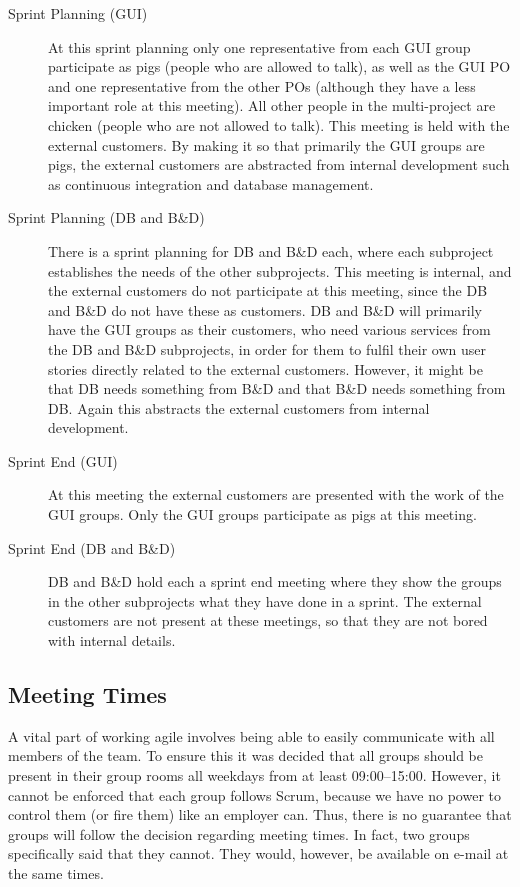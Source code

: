 \begin{description}
  \item[Sprint Planning (GUI)] At this sprint planning only one representative from each GUI group participate as pigs (people who are allowed to talk), as well as the GUI PO and one representative from the other POs (although they have a less important role at this meeting). All other people in the multi-project are chicken (people who are not allowed to talk). This meeting is held with the external customers. By making it so that primarily the GUI groups are pigs, the external customers are abstracted from internal development such as continuous integration and database management.
  \item[Sprint Planning (DB and B\&D)] There is a sprint planning for DB and B\&D each, where each subproject establishes the needs of the other subprojects. This meeting is internal, and the external customers do not participate at this meeting, since the DB and B\&D do not have these as customers. DB and B\&D will primarily have the GUI groups as their customers, who need various services from the DB and B\&D subprojects, in order for them to fulfil their own user stories directly related to the external customers. However, it might be that DB needs something from B\&D and that B\&D needs something from DB. Again this abstracts the external customers from internal development.
  \item[Sprint End (GUI)] At this meeting the external customers are presented with the work of the GUI groups. Only the GUI groups participate as pigs at this meeting.
  \item[Sprint End (DB and B\&D)] DB and B\&D hold each a sprint end meeting where they show the groups in the other subprojects what they have done in a sprint. The external customers are not present at these meetings, so that they are not bored with internal details.
\end{description}

\subsection{Meeting Times}
A vital part of working agile involves being able to easily communicate with all members of the team. To ensure this it was decided that all groups should be present in their group rooms all weekdays from at least 09:00--15:00. However, it cannot be enforced that each group follows Scrum, because we have no power to control them (or fire them) like an employer can. Thus, there is no guarantee that groups will follow the decision regarding meeting times. In fact, two groups specifically said that they cannot. They would, however, be available on e-mail at the same times.

